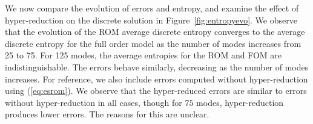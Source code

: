 \documentclass[review]{siamart171218}
\theoremstyle{assumption}
\begin{document}
We now compare the evolution of errors and entropy, and examine the effect of hyper-reduction on the discrete solution in Figure~\ref{fig:entropyevo}.  We observe that the evolution of the ROM average discrete entropy converges to the average discrete entropy for the full order model as the number of modes increases from 25 to 75.  For 125 modes, the average entropies for the ROM and FOM are indistinguishable.  The errors behave similarly, decreasing as the number of modes increases.  For reference, we also include errors computed without hyper-reduction using (\ref{eq:esrom}).  We observe that the hyper-reduced errors are similar to errors without hyper-reduction in all cases, though for $75$ modes, hyper-reduction produces lower errors.  The reasons for this are unclear.
\begin{figure}
\centering
{}
\hspace{.5em}

\end{figure}
\end{document}
